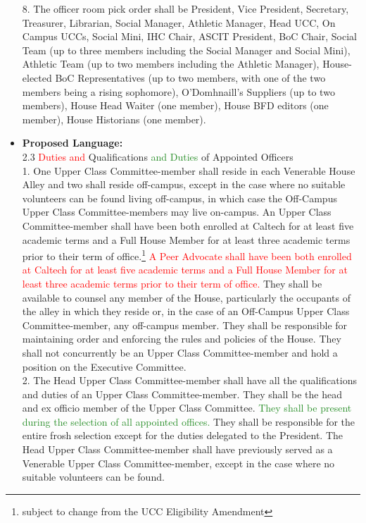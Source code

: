 \documentclass[10pt]{article} %
\newcommand{\add}[1]{\textcolor{ForestGreen}{#1}} %
\newcommand{\del}[1]{\textcolor{red}{#1}} %
\begin{document}
\begin{itemize}
        8. The officer room pick order shall be President, Vice President, Secretary, Treasurer, Librarian, Social Manager, Athletic Manager, Head UCC, On Campus UCCs, Social Mini, IHC Chair, ASCIT President, BoC Chair, Social Team (up to three members including the Social Manager and Social Mini), Athletic Team (up to two members including the Athletic Manager), House-elected BoC Representatives (up to two members, with one of the two members being a rising sophomore), O'Domhnaill's Suppliers (up to two members), House Head Waiter (one member), House BFD editors (one member), House Historians (one member).

    \item \textbf{Proposed Language:} \\
        2.3 \del{Duties and} Qualifications \add{and Duties} of Appointed Officers \\
        1. One Upper Class Committee-member shall reside in each Venerable House Alley and two shall reside off-campus, except in the case where no suitable volunteers can be found living off-campus, in which case the Off-Campus Upper Class Committee-members may live on-campus. An Upper Class Committee-member shall have been both enrolled at Caltech for at least five academic terms and a Full House Member for at least three academic terms prior to their term of office.\footnote{subject to change from the UCC Eligibility Amendment} \del{A Peer Advocate shall have been both enrolled at Caltech for at least five academic terms and a Full House Member for at least three academic terms prior to their term of office.} They shall be available to counsel any member of the House, particularly the occupants of the alley in which they reside or, in the case of an Off-Campus Upper Class Committee-member, any off-campus member. They shall be responsible for maintaining order and enforcing the rules and policies of the House. They shall not concurrently be an Upper Class Committee-member and hold a position on the Executive Committee. \\
        2. The Head Upper Class Committee-member shall have all the qualifications and duties of an Upper Class Committee-member. They shall be the head and ex officio member of the Upper Class Committee. \add{They shall be present during the selection of all appointed offices.} They shall be responsible for the entire frosh selection except for the duties delegated to the President. The Head Upper Class Committee-member shall have previously served as a Venerable Upper Class Committee-member, except in the case where no suitable volunteers can be found. \\

\end{itemize}
\end{document}
